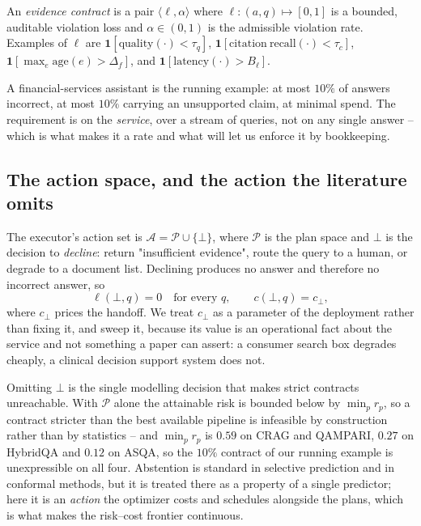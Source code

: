 \begin{definition}
\label{def:contract}
An \emph{evidence contract} is a pair $\langle \ell, \alpha\rangle$
where $\ell : (a, q) \mapsto [0,1]$ is a bounded, auditable violation
loss and $\alpha \in (0,1)$ is the admissible violation rate. Examples
of $\ell$ are
$\mathbf{1}[\mathrm{quality}(\cdot) < \tau_q]$,
$\mathbf{1}[\mathrm{citation\ recall}(\cdot) < \tau_c]$,
$\mathbf{1}[\max_{e} \mathrm{age}(e) > \Delta_f]$, and
$\mathbf{1}[\mathrm{latency}(\cdot) > B_\ell]$.
\end{definition}

A financial-services assistant is the running example: at most $10\%$ of
answers incorrect, at most $10\%$ carrying an unsupported claim, at
minimal spend. The requirement is on the \emph{service}, over a stream
of queries, not on any single answer -- which is what makes it a rate
and what will let us enforce it by bookkeeping.

\subsection{The action space, and the action the literature omits}
\label{sec:actions}

The executor's action set is
$\mathcal{A} = \mathcal{P} \cup \{\bot\}$, where $\mathcal{P}$ is the
plan space and $\bot$ is the decision to \emph{decline}: return
"insufficient evidence", route the query to a human, or degrade to a
document list. Declining produces no answer and therefore no incorrect
answer, so
\begin{equation}
\label{eq:abstain}
\ell(\bot, q) = 0 \quad\text{for every } q ,
\qquad c(\bot, q) = c_\bot ,
\end{equation}
where $c_\bot$ prices the handoff. We treat $c_\bot$ as a parameter of
the deployment rather than fixing it, and sweep it, because its value is
an operational fact about the service and not something a paper can
assert: a consumer search box degrades cheaply, a clinical decision
support system does not.

Omitting $\bot$ is the single modelling decision that makes strict
contracts unreachable. With $\mathcal{P}$ alone the attainable risk is
bounded below by $\min_p r_p$, so a contract stricter than the best
available pipeline is infeasible by construction rather than by
statistics -- and $\min_p r_p$ is $0.59$ on CRAG and QAMPARI, $0.27$ on
HybridQA and $0.12$ on ASQA, so the $10\%$ contract of our running
example is unexpressible on all four.
Abstention is standard in selective prediction
\citep{geifman2017selective,angelopoulos2021gentle} and in conformal
methods, but it is treated there as a property of a single predictor;
here it is an \emph{action} the optimizer costs and schedules alongside
the plans, which is what makes the risk--cost frontier continuous.

